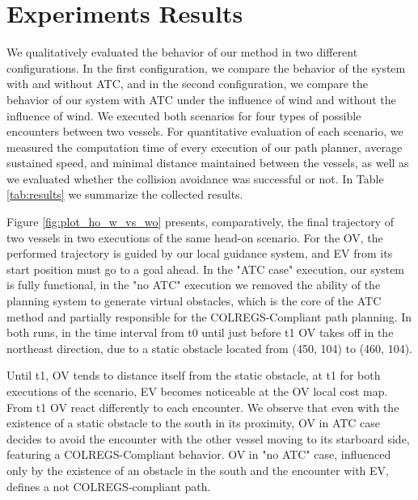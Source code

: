     \section{Experiments Results}

        We qualitatively evaluated the behavior of our method in two different configurations. In the first configuration, we compare the behavior of the system with and without \ac{ATC}, and in the second configuration, we compare the behavior of our system with \ac{ATC} under the influence of wind and without the influence of wind. We executed both scenarios for four types of possible encounters between two vessels. For quantitative evaluation of each scenario, we measured the computation time of every execution of our path planner, average sustained speed, and minimal distance maintained between the vessels, as well as we evaluated whether the collision avoidance was successful or not. In Table \ref{tab:results} we summarize the collected results.

        Figure \ref{fig:plot_ho_w_vs_wo} presents, comparatively, the final trajectory of two vessels in two executions of the same head-on scenario. For the \ac{OV}, the performed trajectory is guided by our local guidance system, and \ac{EV} from its start position must go to a goal ahead. In the "\ac{ATC} case" execution, our system is fully functional, in the "no \ac{ATC}" execution we removed the ability of the planning system to generate virtual obstacles, which is the core of the \ac{ATC} method and partially responsible for the COLREGS-Compliant path planning. In both runs, in the time interval from t0 until just before t1 \ac{OV} takes off in the northeast direction, due to a static obstacle located from (450, 104) to (460, 104).
        
        Until t1, \ac{OV} tends to distance itself from the static obstacle, at t1 for both executions of the scenario, \ac{EV} becomes noticeable at the \ac{OV} local cost map. From t1 \ac{OV} react differently to each encounter. We observe that even with the existence of a static obstacle to the south in its proximity, \ac{OV} in \ac{ATC} case decides to avoid the encounter with the other vessel moving to its starboard side, featuring a COLREGS-Compliant behavior. \ac{OV} in "no \ac{ATC}" case, influenced only by the existence of an obstacle in the south and the encounter with \ac{EV}, defines a not COLREGS-compliant path.
        
